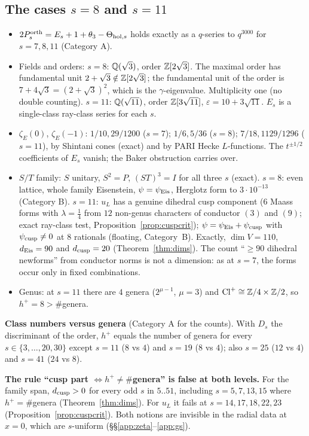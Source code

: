 \subsection{The cases $s=8$ and $s=11$}\label{app:s811}
\begin{itemize}[leftmargin=2em]
\item $2P^{\mathrm{orth}}_s=E_s+1+\theta_3-\Theta_{\mathrm{hol},s}$ holds exactly as a $q$-series to $q^{3000}$ for $s=7,8,11$ (Category A).
\item Fields and orders: $s=8$: $\mathbb{Q}(\sqrt3)$, order $\mathbb{Z}[2\sqrt3]$. The maximal order has fundamental unit $2+\sqrt3\notin\mathbb{Z}[2\sqrt3]$; the fundamental unit of the
order is $7+4\sqrt3=(2+\sqrt3)^2$, which is the $\gamma$-eigenvalue. Multiplicity one (no double counting). $s=11$: $\mathbb{Q}(\sqrt{11})$, order $\mathbb{Z}[3\sqrt{11}]$,
$\varepsilon=10+3\sqrt{11}$. $E_s$ is a single-class ray-class series for each $s$.
\item $\zeta_E(0)$, $\zeta_E(-1)$: $1/10, 29/1200$ ($s=7$); $1/6, 5/36$ ($s=8$); $7/18, 1129/1296$ ($s=11$), by Shintani cones (exact) and by PARI Hecke $L$-functions.
The $t^{\pm1/2}$ coefficients of $E_s$ vanish; the Baker obstruction carries over.
\item $S/T$ family: $S$ unitary, $S^2=P$, $(ST)^3=I$ for all three $s$ (exact). $s=8$: even lattice, whole family Eisenstein, $\psi=\psi_{\rm Eis}$, Herglotz form to
$3\cdot10^{-13}$ (Category B). $s=11$: $u_L$ has a genuine dihedral cusp component ($6$ Maass forms with $\lambda=\tfrac14$ from $12$ non-genus characters of
conductor $(3)$ and $(9)$; exact ray-class test, Proposition~\ref{prop:cuspcrit}); $\psi=\psi_{\rm Eis}+\psi_{\rm cusp}$ with $\psi_{\rm cusp}\neq0$ at $8$ rationals
(floating, Category~B). Exactly, $\dim V=110$, $d_{\rm Eis}=90$ and $d_{\rm cusp}=20$ (Theorem~\ref{thm:dims}). The count ``$\ge90$ dihedral newforms'' from conductor
norms is not a dimension: as at $s=7$, the forms occur only in fixed combinations.
\item Genus: at $s=11$ there are $4$ genera ($2^{\mu-1}$, $\mu=3$) and $\mathrm{Cl}^+\cong\mathbb{Z}/4\times\mathbb{Z}/2$, so $h^+=8>\#$genera.
\end{itemize}
\textbf{Class numbers versus genera} (Category A for the counts). With $D_s$ the discriminant of the order, $h^+$ equals the number of genera for every
$s\in\{3,\dots,20,30\}$ except $s=11$ ($8$ vs $4$) and $s=19$ ($8$ vs $4$); also $s=25$ ($12$ vs $4$) and $s=41$ ($24$ vs $8$).

\textbf{The rule ``cusp part $\Leftrightarrow h^+\neq\#$genera'' is false at both levels.} For the family span, $d_{\rm cusp}>0$ for every odd $s$ in $5..51$, including
$s=5,7,13,15$ where $h^+=\#$genera (Theorem~\ref{thm:dims}). For $u_L$ it fails at $s=14,17,18,22,23$ (Proposition~\ref{prop:cuspcrit}). Both notions are invisible in
the radial data at $x=0$, which are $s$-uniform (\S\S\ref{app:zeta}--\ref{app:gs}).

